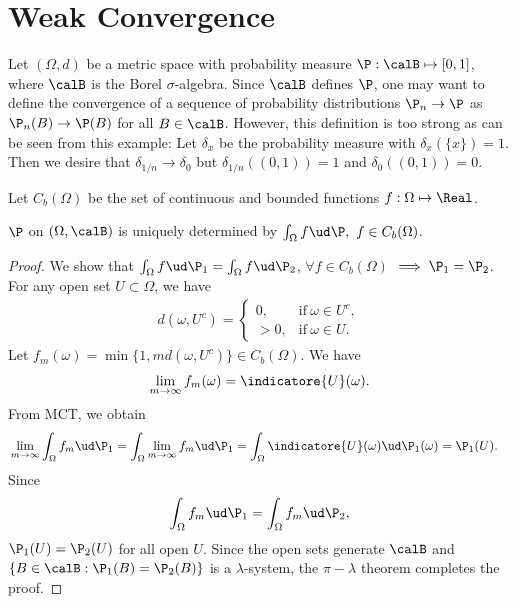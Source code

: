 \documentclass[../aipt.tex]{subfiles}
\begin{document}

\section{Weak Convergence}
Let $\left(\Omega, d\right)$ be a metric space with probability measure $\P: \calB \mapsto \left[0, 1\right]$, where $\calB$ is the Borel $\sigma$-algebra. Since $\calB$ defines $\P$, one may want to define the convergence of a sequence of probability distributions $\P_n \to \P$ as $\P_n(B)\to\P(B)$ for all $B\in\calB$. However, this definition is too strong as can be seen from this example: Let $\delta_x$ be the probability measure with $\delta_x(\{x\})=1$. Then we desire that $\delta_{1/n} \to \delta_0$ but $\delta_{1/n}((0,1))=1$ and $\delta_0((0,1))=0$.
 
Let $C_b(\Omega)$ be the set of continuous and bounded functions $f: \Omega \mapsto \Real$. 
\begin{Lemma}
$\P$ on $\left(\Omega, \calB\right)$ is uniquely determined by $\int_{\Omega} f \ud\P, \ f\in C_b(\Omega)$.
\end{Lemma}
\begin{proof}
We show that $\int_{\Omega} f \ud\P_1 = \int_{\Omega} f \ud\P_2$, $\forall f\in C_b(\Omega)$ $\implies \P_1 = \P_2$. For any open set $U \subset \Omega$, we have
\begin{align*}
d(\omega, U^c) = 
\begin{cases} 
0, & \text{if} \ \omega \in U^c, \\ 
> 0, & \text{if}\ \omega \in U. 
\end{cases}
\end{align*}
Let 
$f_m(\omega) = \min \big\{1, m d(\omega, U^c)\big\}\in C_b(\Omega)$. We have 
\begin{align*}
\lim_{m \to \infty} f_m(\omega) = \indicatore{U}(\omega).
\end{align*}
From MCT, we obtain
\begin{align*}
&\lim_{m \to \infty} \int_{\Omega} f_m \ud\P_1
= \int_{\Omega} \lim_{m \to \infty} f_m \ud\P_1
= \int_{\Omega} \indicatore{U}(\omega) \ud\P_1(\omega)
= \P_1(U).
\end{align*}
Since
\begin{align*}
\int_{\Omega} f_m \ud\P_1 = \int_{\Omega} f_m \ud\P_2,
\end{align*}
$\P_1(U) = \P_2(U)$ for all open $U$. Since the open sets generate $\calB$ and $\{B\in\calB : \P_1(B)=\P_2(B)\}$ is a $\lambda$-system, the $\pi-\lambda$ theorem completes the proof.
\end{proof}
\end{document}
